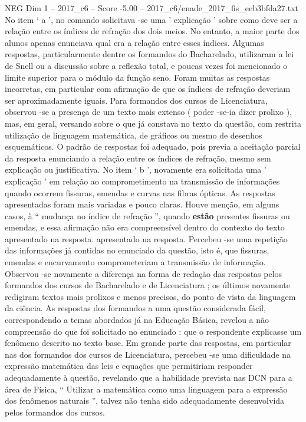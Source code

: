 \begin{textsample}{NEG Dim 1 – 2017\_c6 – Score -5.00 – 2017\_c6/enade\_2017\_fis\_eeb3bfda27.txt}
No item ‘ a ’, no comando solicitava -se uma ' explicação ' sobre como deve ser a relação entre os índices de refração dos dois meios.
No entanto, a maior parte dos alunos apenas enunciava qual era a relação entre esses índices.
Algumas respostas, particularmente dentre os formandos do Bacharelado, utilizaram a lei de Snell ou a discussão sobre a reflexão total, e poucas vezes foi mencionado o limite superior para o módulo da função seno.
Foram muitas as respostas incorretas, em particular com afirmação de que os índices de refração deveriam ser aproximadamente iguais.
Para formandos dos cursos de Licenciatura, observou -se a presença de um texto mais extenso ( poder -se-ia dizer prolixo ), mas, em geral, versando sobre o que já constava no texto da questão, com restrita utilização de linguagem matemática, de gráficos ou mesmo de desenhos esquemáticos.
O padrão de respostas foi adequado, pois previa a aceitação parcial da resposta enunciando a relação entre os índices de refração, mesmo sem explicação ou justificativa.
No item ‘ b ’, novamente era solicitada uma ' explicação ' em relação ao comprometimento na transmissão de informações quando ocorrem fissuras, emendas e curvas nas fibras ópticas.
As respostas apresentadas foram mais variadas e pouco claras.
Houve menção, em alguns casos, à “ mudança no índice de refração ”, quando \textbf{estão} presentes fissuras ou emendas, e essa afirmação não era compreensível dentro do contexto do texto apresentado na resposta. apresentado na resposta.
Percebeu -se uma repetição das informações já contidas no enunciado da questão, isto é, que fissuras, emendas e encurvamento comprometeriam a transmissão de informação.
Observou -se novamente a diferença na forma de redação das respostas pelos formandos dos cursos de Bacharelado e de Licenciatura ; os últimos novamente redigiram textos mais prolixos e menos precisos, do ponto de vista da linguagem da ciência.
As respostas dos formandos a uma questão considerada fácil, correspondendo a temas abordados já na Educação Básica, revelou a não compreensão do que foi solicitado no enunciado : que o respondente explicasse um fenômeno descrito no texto base.
Em grande parte das respostas, em particular nas dos formandos dos cursos de Licenciatura, percebeu -se uma dificuldade na expressão matemática das leis e equações que permitiriam responder adequadamente à questão, revelando que a habilidade prevista nas DCN para a área de Física, “ Utilizar a matemática como uma linguagem para a expressão dos fenômenos naturais ”, talvez não tenha sido adequadamente desenvolvida pelos formandos dos cursos.

\end{textsample}
